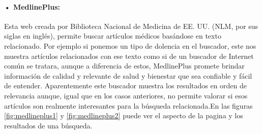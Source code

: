 \paragraph{• MedlinePlus\cite{ref:medlineplus_home}:} Esta web creada por Biblioteca Nacional de Medicina de EE. UU. (NLM, por sus siglas en inglés), permite buscar artículos médicos basándose en texto relacionado. Por ejemplo si ponemos un tipo de dolencia en el buscador, este nos muestra artículos relacionados con ese texto como si de un buscador de Internet común se tratara, aunque a diferencia de estos, MedlinePlus promete brindar información de calidad y relevante de salud y bienestar que sea confiable y fácil de entender. Aparentemente este buscador muestra los resultados en orden de relevancia aunque, igual que en los casos anteriores, no permite valorar si esos artículos son realmente interesantes para la búsqueda relacionada.En las figuras \ref{fig:medlineplus1} y \ref{fig:medlineplus2} puede ver el aspecto de la pagina y los resultados de una búsqueda.

